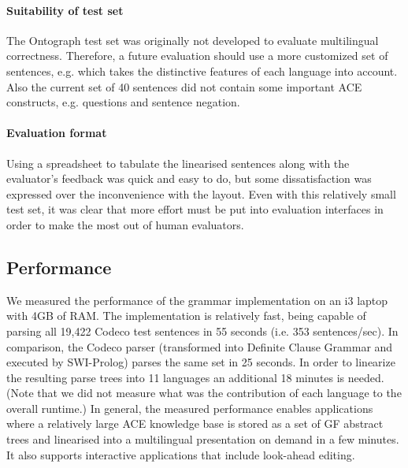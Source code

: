 \documentclass[a4paper]{article}
\begin{document}
\paragraph{Suitability of test set}

The Ontograph test set was originally not developed to evaluate multilingual
correctness. Therefore, a future evaluation should use a more customized
set of sentences, e.g. which takes the distinctive features of each language
into account.
Also the current set of 40 sentences did not contain some important ACE
constructs, e.g. questions and sentence negation.


\paragraph{Evaluation format}
Using a spreadsheet to tabulate the linearised sentences along with
the evaluator's feedback was quick and easy to do, but some
dissatisfaction was expressed over the inconvenience with the
layout. Even with this relatively small test set, it was clear that
more effort must be put into evaluation interfaces in order to make
the most out of human evaluators.

\subsection{Performance}

We measured the performance of the grammar implementation on an i3 laptop
with 4GB of RAM.
The implementation is relatively fast, being capable of parsing
all 19,422 Codeco test sentences in 55 seconds
(i.e. 353 sentences/sec). In comparison, the Codeco parser (transformed into
Definite Clause Grammar and executed by SWI-Prolog) parses
the same set in 25 seconds.
In order to linearize the
resulting parse trees into 11 languages an additional 18 minutes is needed.
(Note that we did not measure what was
the contribution of each language to the overall runtime.)
In general,
the measured performance enables applications where a relatively large ACE
knowledge base is stored as a set of GF abstract trees and linearised into a
multilingual presentation on demand in a few minutes. It also supports
interactive applications that include look-ahead editing.
\end{document}
